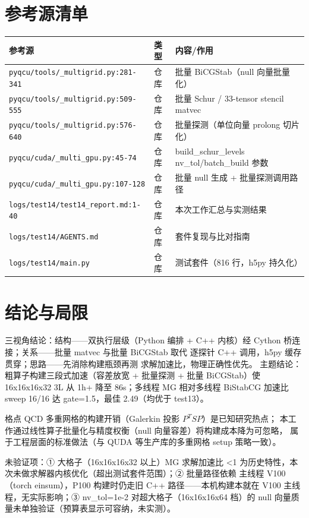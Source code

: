 \documentclass[UTF8]{ctexart}
\begin{document}
\section{参考源清单}
\begin{xltabular}{\textwidth}{llX}
\toprule
\textcolor{evidence}{参考源} & 类型 & 内容/作用 \\
\midrule
\endhead
\texttt{\nolinkurl{pyqcu/tools/_multigrid.py:281-341}} & 仓库 & 批量 BiCGStab（null 向量批量化） \\
\texttt{\nolinkurl{pyqcu/tools/_multigrid.py:509-555}} & 仓库 & 批量 Schur / 33-tensor stencil matvec \\
\texttt{\nolinkurl{pyqcu/tools/_multigrid.py:576-640}} & 仓库 & 批量探测（单位向量 prolong 切片化） \\
\texttt{\nolinkurl{pyqcu/cuda/_multi_gpu.py:45-74}} & 仓库 & build\_schur\_levels nv\_tol/batch\_build 参数 \\
\texttt{\nolinkurl{pyqcu/cuda/_multi_gpu.py:107-128}} & 仓库 & 批量 null 生成 + 批量探测调用路径 \\
\texttt{\nolinkurl{logs/test14/test14_report.md:1-40}} & 仓库 & 本次工作汇总与实测结果 \\
\texttt{\nolinkurl{logs/test14/AGENTS.md}} & 仓库 & 套件复现与比对指南 \\
\texttt{\nolinkurl{logs/test14/main.py}} & 仓库 & 测试套件（816 行，h5py 持久化） \\
\bottomrule
\end{xltabular}

\section{结论与局限}
\begin{conclbox}
三视角结论：\textcolor{struct}{结构}——双执行层级（Python 编排 + C++ 内核）经
Cython 桥连接；\textcolor{relation}{关系}——批量 matvec 与批量 BiCGStab 取代
逐探针 C++ 调用，h5py 缓存贯穿；\textcolor{idea}{思路}——先消除构建瓶颈再测
求解加速比，物理正确性优先。
主题结论：粗算子构建三段式加速（容差放宽 + 批量探测 + 批量 BiCGStab）使
16x16x16x32 3L 从 1h+ 降至 86s；多线程 MG 相对多线程 BiStabCG 加速比
sweep 16/16 达 gate=1.5，最佳 2.49（均优于 test13）。
\end{conclbox}
\begin{refbox}
格点 QCD 多重网格的构建开销（Galerkin 投影 $P^T S P$）是已知研究热点；
本工作通过线性算子批量化与精度权衡（null 向量容差）将构建成本降为可忽略，
属于工程层面的标准做法（与 QUDA 等生产库的多重网格 setup 策略一致）。
\end{refbox}
\begin{warnbox}
\textcolor{warn}{未验证}项：① 大格子（16x16x16x32 以上）MG 求解加速比 <1
为历史特性，本次未做求解器内核优化（超出测试套件范围）；② 批量路径依赖
主线程 V100（torch einsum），P100 构建时仍走旧 C++ 路径——本机构建本就在
V100 主线程，无实际影响；③ nv\_tol=1e-2 对超大格子（16x16x16x64 档）的
null 向量质量未单独验证（预算表显示可容纳，未实测）。
\end{warnbox}
\end{document}
